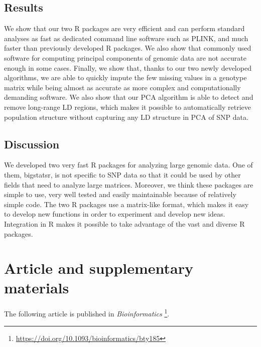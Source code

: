 \subsection{Results}

We show that our two R packages are very efficient and can perform standard analyses as fast as dedicated command line software such as PLINK, and much faster than previously developed R packages.
We also show that commonly used software for computing principal components of genomic data are not accurate enough in some cases.
Finally, we show that, thanks to our two newly developed algorithms, we are able to quickly impute the few missing values in a genotype matrix while being almost as accurate as more complex and computationally demanding software. We also show that our PCA algorithm is able to detect and remove long-range LD regions, which makes it possible to automatically retrieve population structure without capturing any LD structure in PCA of SNP data.

\subsection{Discussion}

We developed two very fast R packages for analyzing large genomic data. One of them, bigstatsr, is not specific to SNP data so that it could be used by other fields that need to analyze large matrices.
Moreover, we think these packages are simple to use, very well tested and easily maintainable because of relatively simple code.
The two R packages use a matrix-like format, which makes it
easy to develop new functions in order to experiment and develop
new ideas. Integration in R makes it possible to take advantage of
the vast and diverse R packages.


\section{Article and supplementary materials}

The following article is published in \textit{Bioinformatics}	\footnote{\url{https://doi.org/10.1093/bioinformatics/bty185}}.



